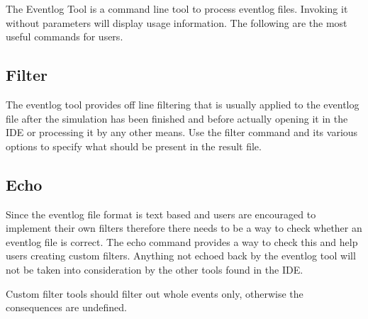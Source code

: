 The Eventlog Tool is a command line tool to process eventlog files. Invoking it without
parameters will display usage information. The following are the most useful commands for users.

\subsection{Filter}

The eventlog tool provides off line filtering that is usually applied to the eventlog file
after the simulation has been finished and before actually opening it in the {\opp} IDE
or processing it by any other means. Use the filter command and its various options to
specify what should be present in the result file.

\subsection{Echo}

Since the eventlog file format is text based and users are encouraged to implement their
own filters therefore there needs to be a way to check whether an eventlog file is
correct. The echo command provides a way to check this and help users creating custom
filters. Anything not echoed back by the eventlog tool will not be taken into
consideration by the other tools found in the {\opp} IDE.

\begin{note}
    Custom filter tools should filter out whole events only, otherwise the
    consequences are undefined.
\end{note}

